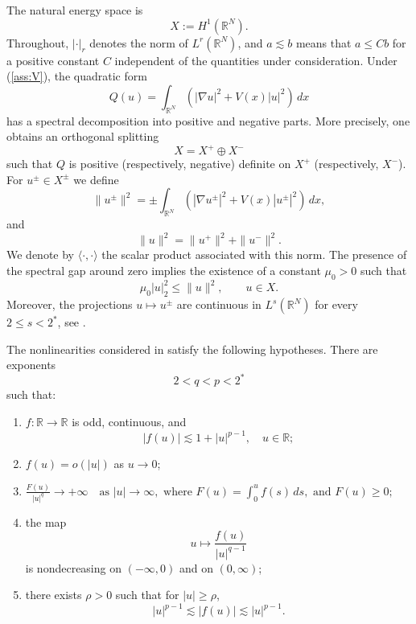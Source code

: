 \documentclass[11pt]{amsart}
\numberwithin{equation}{section}
\theoremstyle{definition}
\newcommand{\R}{\mathbb{R}}
\begin{document}
The natural energy space is
\[
X:=H^1(\R^N).
\]
Throughout, $|\cdot|_r$ denotes the norm of $L^r(\R^N)$, and
$a\lesssim b$ means that $a\le Cb$ for a positive constant $C$ independent
of the quantities under consideration. Under (\ref{ass:V}), the quadratic form
\[
Q(u)=\int_{\R^N}\left(|\nabla u|^2+V(x)|u|^2\right)\,dx
\]
has a spectral decomposition into positive and negative parts. More precisely, one
obtains an orthogonal splitting
\[
X=X^+\oplus X^-
\]
such that $Q$ is positive (respectively, negative) definite on $X^+$ (respectively, $X^-$). For $u^\pm\in X^\pm$ we define
\[
\|u^\pm\|^2
=
\pm\int_{\R^N}\left(|\nabla u^\pm|^2
+V(x)|u^\pm|^2\right)\,dx,
\]
and
\[
\|u\|^2=\|u^+\|^2+\|u^-\|^2.
\]
We denote by $\langle\cdot,\cdot\rangle$ the scalar product associated
with this norm. The presence of the spectral gap around zero implies the existence of a constant $\mu_0>0$ such that
\begin{equation}\label{eq:mu0}
\mu_0|u|_2^2\le \|u\|^2,\qquad u\in X.
\end{equation}
Moreover, the projections $u\mapsto u^\pm$ are continuous in
$L^s(\R^N)$ for every $2\le s<2^*$, see \cite[Proposition 7]{Troestler}.

The nonlinearities considered in \cite{BB2022,BBS2025} satisfy the
following hypotheses. There are exponents
\[
2<q<p<2^*
\]
such that:

\begin{enumerate}[label=(F\arabic*)]
\item $f:\R\to\R$ is odd, continuous, and
\[
|f(u)|\lesssim 1+|u|^{p-1}, \quad u \in \R;
\]
\item $f(u)=o(|u|)$ as $u\to0$;
\item
$
\frac{F(u)}{|u|^q}\to+\infty
\quad\text{as } |u|\to\infty, \mbox{ where } F(u)=\int_0^u f(s)\,ds, \mbox{ and } 
F(u)\ge0;
$
\item the map
\[
u\mapsto \frac{f(u)}{|u|^{q-1}}
\]
is nondecreasing on $(-\infty,0)$ and on $(0,\infty)$;
\item there exists $\rho>0$ such that for $|u|\ge\rho$,
\[
|u|^{p-1}\lesssim |f(u)|\lesssim |u|^{p-1}.
\]
\end{enumerate}
\end{document}
